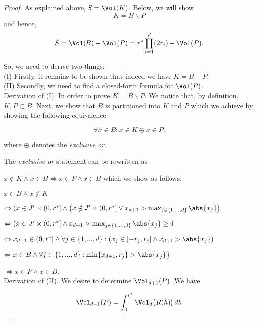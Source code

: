 \begin{lem}
\begin{proof}
As explained above, $\bar S = \Vol(K)$. 
Below, we will show \[ K = B \backslash P \] and hence, 
\begin{equation}
\bar S= \Vol(B) - \Vol(P)=  r^* \prod_{i=1}^d (2r_i) - \Vol(P). 
\end{equation}

So, we need to derive two things:\\
 
(I) Firstly, it remains to be shown that indeed we have $K = B - P$.\\
(II) Secondly, we need to find a closed-form formula for $\Vol (P)$.\\
 


Derivation of (I). In order to prove $K = B \backslash P$. We notice that, by definition, $K,P \subset B$. Next, we show that $B$ is partitioned into $K$ and $P$ which we achieve by showing the following equivalence: 

\[\forall x \in B: x \in K \oplus x \in P. \]

where $\oplus$ denotes the \emph{exclusive or}. 

The \textit{exclusive or} statement can be rewritten as 

$x \notin K \wedge x \in B \Leftrightarrow x \in P \wedge x \in B$ which we show as follows: 


$ x \in B \wedge x \notin K$  

$\Leftrightarrow ( x \in J' \times (0,r^*] \wedge \bigl( x \notin J' \times (0,r^*] \vee x_{d+1} > \max_{j \in \{1,...,d\}} \abs{x_j} \bigr) $ 

$\Leftrightarrow ( x \in J' \times (0,r^*] \wedge   x_{d+1} > \max_{j \in \{1,...,d\}} \abs{x_j} \geq 0 $

$\Leftrightarrow x_{d+1} \in (0,r^*] \wedge \forall j \in \{1,...,d\}: (x_j \in [-r_j,r_j] \wedge  x_{d+1} > \abs{x_j} ) $

$\Leftrightarrow x \in B \wedge \forall j \in \{1,...,d\} : \min \{x_{d+1}, r_j\} > \abs{x_j } \bigr\}$

$\Leftrightarrow x \in P \wedge x \in B$.\\


Derivation of (II). We desire to determine $\Vol_{d+1}(P)$. We have 

\[\Vol_{d+1}(P) = \int_0^{r^*} \Vol_d \bigl(R(h)\bigr) \, dh\]


\end{proof}
\end{lem}

